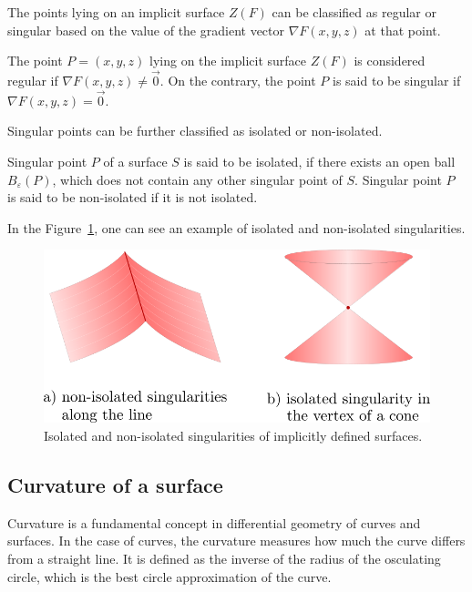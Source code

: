 The points lying on an implicit surface $Z(F)$ can be classified as regular or
singular based on the value of the gradient vector $\nabla F(x, y, z)$ at that point.

\begin{definition}
    The point $P=(x,y,z)$ lying on the implicit surface $Z(F)$ is considered regular
    if $\nabla F(x, y, z) \neq \vec{0}$. On the contrary, the point $P$ is said to be 
    singular if $\nabla F(x, y, z) = \vec{0}$.
\end{definition}

Singular points can be further classified as isolated or non-isolated.

\begin{definition}
    Singular point $P$ of a surface $S$ is said to be isolated,
    if there exists an open ball $B_\varepsilon(P)$, which does not 
    contain any other singular point of $S$.
    Singular point $P$ is said to be non-isolated if it is not isolated.
\end{definition}

In the Figure~\ref{img:2}, one can see an example of isolated and non-isolated
singularities.

\begin{figure}[h!]
    \centerline{\includegraphics[scale=0.5]{images/img2}}
    \caption[Isolated and non-isolated singularities of an implicitly defined surfaces]
    {Isolated and non-isolated singularities of implicitly defined surfaces.}
    \label{img:2}
\end{figure}

\subsection{Curvature of a surface}

Curvature is a fundamental concept in differential geometry of curves and surfaces.
In the case of curves, the curvature measures how much the curve differs from a 
straight line. It is defined as the inverse of the radius of the osculating circle,
which is the best circle approximation of the curve.


